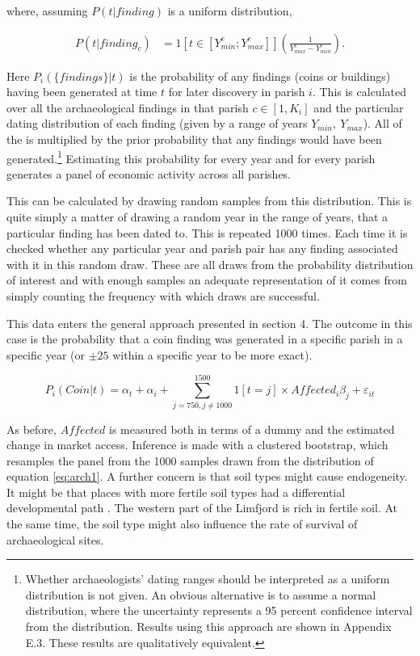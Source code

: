 \documentclass[11pt]{article}
\begin{document}
where, assuming $P(t|finding)$ is a uniform distribution,

\begin{equation}
\begin{split}
\label{eq:arch12}
P(t|finding_c)& = 1[t\in [Y_{min}^c;Y_{max}^c]] \left(\frac{1}{Y_{max}^c - Y_{min}^c}\right).
\end{split}
\end{equation}

Here $P_i(\{findings\}|t)$ is the probability of any findings (coins or buildings) having been generated at time $t$ for later discovery in parish $i$. This is calculated over all the archaeological findings in that parish $c \in [1, K_i]$ and the particular dating distribution of each finding (given by a range of years $Y_{min},\: Y_{max}$). All of the is multiplied by the prior probability that any findings would have been generated.\footnote{Whether archaeologists' dating ranges should be interpreted as a uniform distribution is not given. An obvious alternative is to assume a normal distribution, where the uncertainty represents a 95 percent confidence interval from the distribution. Results using this approach are shown in Appendix E.3. These results are qualitatively equivalent.} Estimating this probability for every year and for every parish generates a panel of economic activity across all parishes. 

This can be calculated by drawing random samples from this distribution. This is quite simply a matter of drawing a random year in the range of years, that a particular finding has been dated to. This is repeated 1000 times. Each time it is checked whether any particular year and parish pair has any finding associated with it in this random draw. These are all draws from the probability distribution of interest and with enough samples an adequate representation of it comes from simply counting the frequency with which draws are successful. 

This data enters the general approach presented in section 4. The outcome in this case is the probability that a coin finding was generated in a specific parish in a specific year (or $\pm 25$ within a specific year to be more exact).

\begin{equation}
\label{eq:eq7_4}
P_i(Coin|t) = \alpha_t + \alpha_i + \sum_{j = 750, j\neq 1000}^{1500} 1[t=j]\times Affected_{i}\beta_{j}  + \varepsilon_{it}
\end{equation}

As before, $Affected$ is measured both in terms of a dummy and the estimated change in market access. Inference is made with a clustered bootstrap, which resamples the panel from the 1000 samples drawn from the distribution of equation \ref{eq:arch1}. A further concern is that soil types might cause endogeneity. It might be that places with more fertile soil types had a differential developmental path \citep{HeavyPlough2016, WinnersAndLosers2022}. The western part of the Limfjord is rich in fertile soil. At the same time, the soil type might also influence the rate of survival of archaeological sites. 
\end{document}
